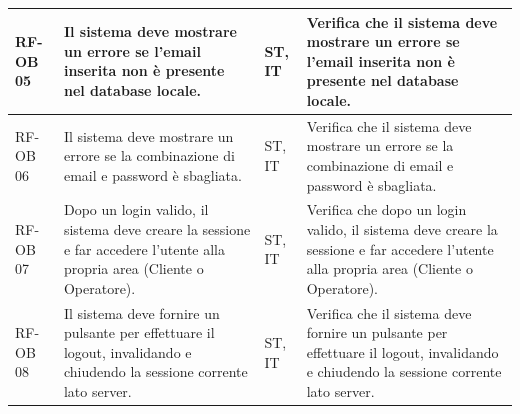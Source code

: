 \documentclass[a4paper,11pt,oneside]{scrartcl}
\begin{document}
\begin{longtable}{|p{1.5cm}|p{4.5cm}|p{1.8cm}|p{6cm}|}
    RF-OB 05         & Il sistema deve mostrare un errore se l'email inserita non è presente nel database locale.                                                                                                                                                                                                            & ST, IT             & Verifica che il sistema deve mostrare un errore se l'email inserita non è presente nel database locale.                                                                                                                                                                                                            \\ \hline
    RF-OB 06         & Il sistema deve mostrare un errore se la combinazione di email e password è sbagliata.                                                                                                                                                                                                                & ST, IT             & Verifica che il sistema deve mostrare un errore se la combinazione di email e password è sbagliata.                                                                                                                                                                                                                \\ \hline
    RF-OB 07         & Dopo un login valido, il sistema deve creare la sessione e far accedere l'utente alla propria area (Cliente o Operatore).                                                                                                                                                                             & ST, IT             & Verifica che dopo un login valido, il sistema deve creare la sessione e far accedere l'utente alla propria area (Cliente o Operatore).                                                                                                                                                                             \\ \hline
    RF-OB 08         & Il sistema deve fornire un pulsante per effettuare il logout, invalidando e chiudendo la sessione corrente lato server.                                                                                                                                                                               & ST, IT             & Verifica che il sistema deve fornire un pulsante per effettuare il logout, invalidando e chiudendo la sessione corrente lato server.                                                                                                                                                                               \\ \hline

\end{longtable}
\end{document}
